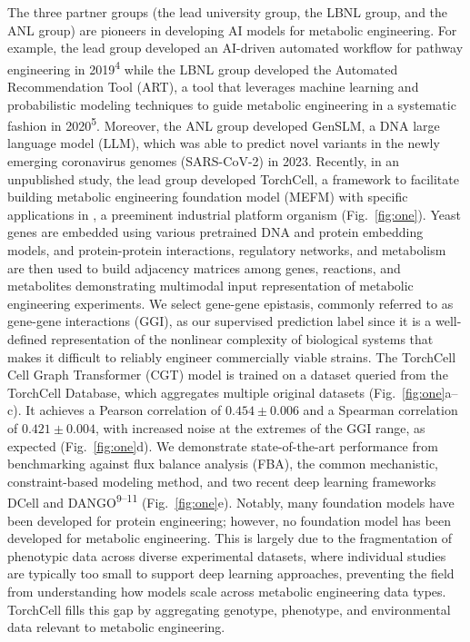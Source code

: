 The three partner groups (the lead university group, the LBNL group, and the ANL
group) are pioneers in developing AI models for metabolic engineering. For example,
the lead group developed an AI-driven automated workflow for pathway engineering in
2019\textsuperscript{4} while the LBNL group developed the Automated Recommendation
Tool (ART), a tool that leverages machine learning and probabilistic modeling
techniques to guide metabolic engineering in a systematic fashion in
2020\textsuperscript{5}. Moreover, the ANL group developed GenSLM, a DNA large
language model (LLM), which was able to predict novel variants in the newly emerging
coronavirus genomes (SARS-CoV-2) in 2023. Recently, in an unpublished study, the lead
group developed TorchCell, a framework to facilitate building metabolic engineering
foundation model (MEFM) with specific applications in ,
a preeminent industrial platform organism (Fig.~\ref{fig:one}). Yeast genes are
embedded using various pretrained DNA and protein embedding models, and
protein-protein interactions, regulatory networks, and metabolism are then used to
build adjacency matrices among genes, reactions, and metabolites demonstrating
multimodal input representation of metabolic engineering experiments. We select
gene-gene epistasis, commonly referred to as gene-gene interactions (GGI), as our
supervised prediction label since it is a well-defined representation of the
nonlinear complexity of biological systems that makes it difficult to reliably
engineer commercially viable strains. The TorchCell Cell Graph Transformer (CGT)
model is trained on a dataset queried from the TorchCell Database, which aggregates
multiple original datasets (Fig.~\ref{fig:one}a--c). It achieves a Pearson
correlation of $0.454 \pm 0.006$ and a Spearman correlation of $0.421 \pm 0.004$,
with increased noise at the extremes of the GGI range, as expected
(Fig.~\ref{fig:one}d). We demonstrate state-of-the-art performance from benchmarking
against flux balance analysis (FBA), the common mechanistic, constraint-based
modeling method, and two recent deep learning frameworks DCell and
DANGO\textsuperscript{9--11} (Fig.~\ref{fig:one}e). Notably, many foundation models
have been developed for protein engineering; however, no foundation model has been
developed for metabolic engineering. This is largely due to the fragmentation of
phenotypic data across diverse experimental datasets, where individual studies are
typically too small to support deep learning approaches, preventing the field from
understanding how models scale across metabolic engineering data types. TorchCell
fills this gap by aggregating genotype, phenotype, and environmental data relevant
to metabolic engineering.

